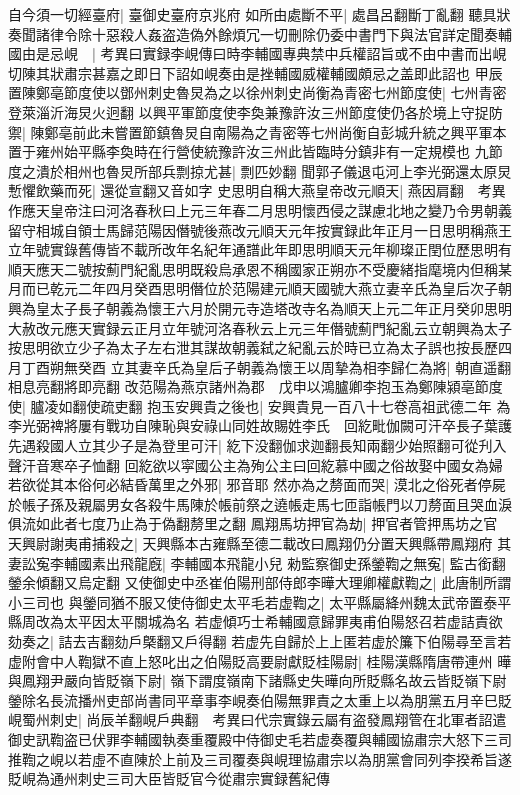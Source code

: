 自今須一切經臺府|{
	臺御史臺府京兆府}
如所由處斷不平|{
	處昌呂翻斷丁亂翻}
聽具狀奏聞諸律令除十惡殺人姦盗造偽外餘煩冗一切刪除仍委中書門下與法官詳定聞奏輔國由是忌峴　|{
	考異曰實録李峴傳曰時李輔國專典禁中兵權詔旨或不由中書而出峴切陳其狀肅宗甚嘉之即日下詔如峴奏由是挫輔國威權輔國頗忌之盖即此詔也}
甲辰置陳鄭亳節度使以鄧州刺史魯炅為之以徐州刺史尚衡為青密七州節度使|{
	七州青密登萊淄沂海炅火迥翻}
以興平軍節度使李奐兼豫許汝三州節度使仍各於境上守捉防禦|{
	陳鄭亳前此未嘗置節鎮魯炅自南陽為之青密等七州尚衡自彭城升統之興平軍本置于雍州始平縣李奐時在行營使統豫許汝三州此皆臨時分鎮非有一定規模也}
九節度之潰於相州也魯炅所部兵剽掠尤甚|{
	剽匹妙翻}
聞郭子儀退屯河上李光弼還太原炅慙懼飲藥而死|{
	還從宣翻又音如字}
史思明自稱大燕皇帝改元順天|{
	燕因肩翻　考異作應天皇帝注曰河洛春秋曰上元三年春二月思明懷西侵之謀慮北地之變乃令男朝義留守相城自領士馬歸范陽因僭號後燕改元順天元年按實録此年正月一日思明稱燕王立年號實錄舊傳皆不載所改年名紀年通譜此年即思明順天元年柳璨正閏位歷思明有順天應天二號按薊門紀亂思明既殺烏承恩不稱國家正朔亦不受慶緒指麾境内但稱某月而已乾元二年四月癸酉思明僭位於范陽建元順天國號大燕立妻辛氏為皇后次子朝興為皇太子長子朝義為懷王六月於開元寺造塔改寺名為順天上元二年正月癸卯思明大赦改元應天實録云正月立年號河洛春秋云上元三年僭號薊門紀亂云立朝興為太子按思明欲立少子為太子左右泄其謀故朝義弑之紀亂云於時已立為太子誤也按長歷四月丁酉朔無癸酉}
立其妻辛氏為皇后子朝義為懷王以周摯為相李歸仁為將|{
	朝直遥翻相息亮翻將即亮翻}
改范陽為燕京諸州為郡　戊申以鴻臚卿李抱玉為鄭陳潁亳節度使|{
	臚凌如翻使疏吏翻}
抱玉安興貴之後也|{
	安興貴見一百八十七卷高祖武德二年}
為李光弼禆將屢有戰功自陳恥與安祿山同姓故賜姓李氏　回紇毗伽闕可汗卒長子葉護先遇殺國人立其少子是為登里可汗|{
	紇下没翻伽求迦翻長知兩翻少始照翻可從刋入聲汗音寒卒子恤翻}
回紇欲以寜國公主為殉公主曰回紇慕中國之俗故娶中國女為婦若欲從其本俗何必結昏萬里之外邪|{
	邪音耶}
然亦為之剺面而哭|{
	漠北之俗死者停屍於帳子孫及親屬男女各殺牛馬陳於帳前祭之遶帳走馬七匝詣帳門以刀剺面且哭血淚俱流如此者七度乃止為于偽翻剺里之翻}
鳳翔馬坊押官為劫|{
	押官者管押馬坊之官}
天興尉謝夷甫捕殺之|{
	天興縣本古雍縣至德二載改曰鳳翔仍分置天興縣帶鳳翔府}
其妻訟寃李輔國素出飛龍廐|{
	李輔國本飛龍小兒}
勑監察御史孫鎣鞫之無寃|{
	監古銜翻鎣余傾翻又烏定翻}
又使御史中丞崔伯陽刑部侍郎李曄大理卿權獻鞫之|{
	此唐制所謂小三司也}
與鎣同猶不服又使侍御史太平毛若虚鞫之|{
	太平縣屬絳州魏太武帝置泰平縣周改為太平因太平關城為名}
若虚傾巧士希輔國意歸罪夷甫伯陽怒召若虚詰責欲劾奏之|{
	詰去吉翻劾戶槩翻又戶得翻}
若虚先自歸於上上匿若虚於簾下伯陽尋至言若虚附會中人鞫獄不直上怒叱出之伯陽貶高要尉獻貶桂陽尉|{
	桂陽漢縣隋唐帶連州}
曄與鳳翔尹嚴向皆貶嶺下尉|{
	嶺下謂度嶺南下諸縣史失曄向所貶縣名故云皆貶嶺下尉}
鎣除名長流播州吏部尚書同平章事李峴奏伯陽無罪責之太重上以為朋黨五月辛巳貶峴蜀州刺史|{
	尚辰羊翻峴戶典翻　考異曰代宗實錄云屬有盗發鳳翔管在北軍者詔遣御史訊鞫盗已伏罪李輔國執奏重覆殿中侍御史毛若虚奏覆與輔國協肅宗大怒下三司推鞫之峴以若虛不直陳於上前及三司覆奏與峴理協肅宗以為朋黨會同列李揆希旨遂貶峴為通州刺史三司大臣皆貶官今從肅宗實録舊紀傳}
